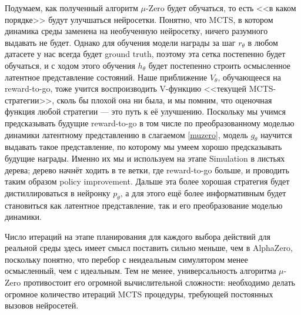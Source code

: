 Подумаем, как полученный алгоритм $\mu$-Zero будет обучаться, то есть <<в каком порядке>> будут улучшаться нейросетки. Понятно, что MCTS, в котором динамика среды заменена на необученную нейросетку, ничего разумного выдавать не будет. Однако для обучения модели награды за шаг $r_{\theta}$ в любом датасете у нас всегда будет ground truth, поэтому эта сетка постепенно будет обучаться, и с ходом этого обучения $h_{\theta}$ будет постепенно строить осмысленное латентное представление состояний. Наше приближение $V_{\theta}$, обучающееся на reward-to-go, тоже учится воспроизводить V-функцию <<текущей MCTS-стратегии>>, сколь бы плохой она ни была, и мы помним, что оценочная функция любой стратегии --- это путь к её улучшению. Поскольку мы учимся предсказывать будущие reward-to-go в том числе по преобразованному моделью динамики латентному представлению в слагаемом \eqref{muzero}, модель $g_{\theta}$ научится выдавать такое представление, по которому мы умеем хорошо предсказывать будущие награды. Именно их мы и используем на этапе Simulation в листьях дерева; дерево начнёт ходить в те ветки, где reward-to-go больше, и проводить таким образом policy improvement. Дальше эта более хорошая стратегия будет дистиллироваться в нейронку $p_{\theta}$, а для этого ещё более информативным будет становиться как латентное представление, так и его преобразование моделью динамики.

\begin{remark}
Число итераций на этапе планирования для каждого выбора действий для реальной среды здесь имеет смысл поставить сильно меньше, чем в AlphaZero, поскольку понятно, что перебор с неидеальным симулятором менее осмысленный, чем с идеальным. Тем не менее, универсальность алгоритма $\mu$-Zero противостоит его огромной вычислительной сложности: необходимо делать огромное количество итераций MCTS процедуры, требующей постоянных вызовов нейросетей. 
\end{remark}

